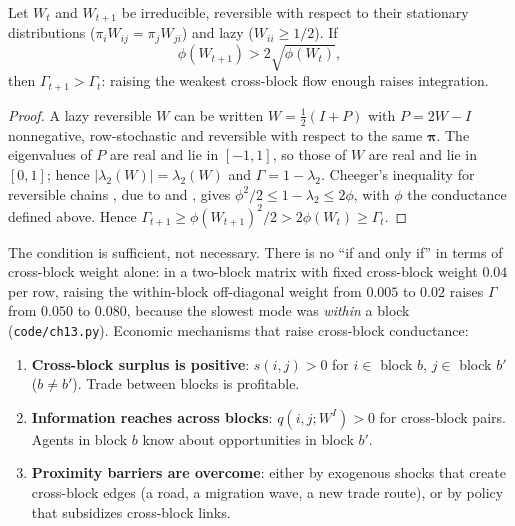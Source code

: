 \documentclass[../structural_economics_book.tex]{subfiles}
\begin{document}
\begin{proposition}\label{ch13:prop:integration}
Let $W_t$ and $W_{t+1}$ be irreducible, reversible with respect to their stationary distributions ($\pi_i W_{ij} = \pi_j W_{ji}$) and lazy ($W_{ii} \geq 1/2$). If
\begin{equation}\label{ch13:eq:cheeger_condition}
\phi(W_{t+1}) > 2\sqrt{\phi(W_t)},
\end{equation}
then $\Gamma_{t+1} > \Gamma_t$: raising the weakest cross-block flow enough raises integration.
\end{proposition}

\begin{proof}
A lazy reversible $W$ can be written $W = \tfrac12(I + P)$ with $P = 2W - I$ nonnegative, row-stochastic and reversible with respect to the same $\boldsymbol{\pi}$. The eigenvalues of $P$ are real and lie in $[-1, 1]$, so those of $W$ are real and lie in $[0, 1]$; hence $|\lambda_2(W)| = \lambda_2(W)$ and $\Gamma = 1 - \lambda_2$. Cheeger's inequality for reversible chains \citep[Thm.~13.14]{levin2009markov}, due to \citet{lawler1988bounds} and \citet{sinclair1989approximate}, gives $\phi^2/2 \leq 1 - \lambda_2 \leq 2\phi$, with $\phi$ the conductance defined above. Hence $\Gamma_{t+1} \geq \phi(W_{t+1})^2/2 > 2\phi(W_t) \geq \Gamma_t$.
\end{proof}

The condition is sufficient, not necessary. There is no ``if and only if'' in terms of cross-block weight alone: in a two-block matrix with fixed cross-block weight $0.04$ per row, raising the within-block off-diagonal weight from $0.005$ to $0.02$ raises $\Gamma$ from $0.050$ to $0.080$, because the slowest mode was \emph{within} a block (\texttt{code/ch13.py}). Economic mechanisms that raise cross-block conductance:
\begin{enumerate}
\item \textbf{Cross-block surplus is positive}: $s(i, j) > 0$ for $i \in$ block $b$, $j \in$ block $b'$ ($b \neq b'$). Trade between blocks is profitable.
\item \textbf{Information reaches across blocks}: $q(i, j; W^I) > 0$ for cross-block pairs. Agents in block $b$ know about opportunities in block $b'$.
\item \textbf{Proximity barriers are overcome}: either by exogenous shocks that create cross-block edges (a road, a migration wave, a new trade route), or by policy that subsidizes cross-block links.
\end{enumerate}
\end{document}
